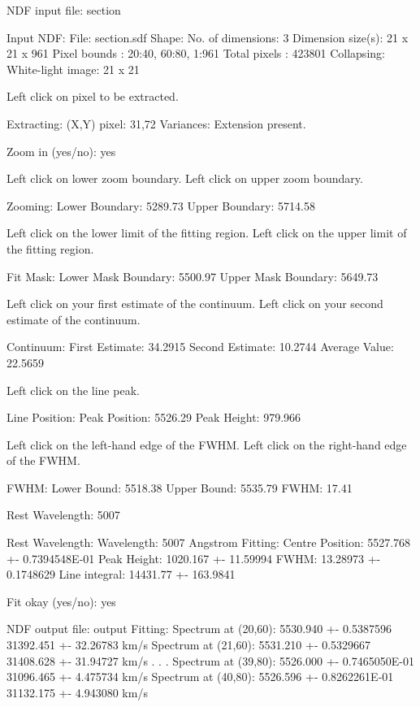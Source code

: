 \documentclass[twoside,11pt]{starlink}
\begin{document}
\begin{small}
\begin{terminalv}
NDF input file: section

     Input NDF:
       File: section.sdf
     Shape:
       No. of dimensions: 3
       Dimension size(s): 21 x 21 x 961
       Pixel bounds     : 20:40, 60:80, 1:961
       Total pixels     : 423801
     Collapsing:
       White-light image: 21 x 21

 Left click on pixel to be extracted.

     Extracting:
       (X,Y) pixel: 31,72
       Variances: Extension present.

Zoom in (yes/no): yes

 Left click on lower zoom boundary.
 Left click on upper zoom boundary.

     Zooming:
       Lower Boundary: 5289.73
       Upper Boundary: 5714.58

 Left click on the lower limit of the fitting region.
 Left click on the upper limit of the fitting region.

     Fit Mask:
       Lower Mask Boundary: 5500.97
       Upper Mask Boundary: 5649.73

 Left click on your first estimate of the continuum.
 Left click on your second estimate of the continuum.

     Continuum:
       First Estimate: 34.2915
       Second Estimate: 10.2744
       Average Value: 22.5659

 Left click on the line peak.

     Line Position:
       Peak Position: 5526.29
       Peak Height: 979.966

 Left click on the left-hand edge of the FWHM.
 Left click on the right-hand edge of the FWHM.

     FWHM:
       Lower Bound: 5518.38
       Upper Bound: 5535.79
       FWHM: 17.41

Rest Wavelength: 5007

     Rest Wavelength:
       Wavelength: 5007 Angstrom
     Fitting:
       Centre Position: 5527.768 +- 0.7394548E-01
       Peak Height: 1020.167 +- 11.59994
       FWHM: 13.28973 +- 0.1748629
       Line integral: 14431.77 +- 163.9841

Fit okay (yes/no): yes

NDF output file: output
     Fitting:
       Spectrum at (20,60): 5530.940 +- 0.5387596
                            31392.451 +- 32.26783 km/s
       Spectrum at (21,60): 5531.210 +- 0.5329667
                            31408.628 +- 31.94727 km/s
                          .
                          .
                          .
       Spectrum at (39,80): 5526.000 +- 0.7465050E-01
                            31096.465 +- 4.475734 km/s
       Spectrum at (40,80): 5526.596 +- 0.8262261E-01
                            31132.175 +- 4.943080 km/s


\end{terminalv}
\end{small}
\end{document}
